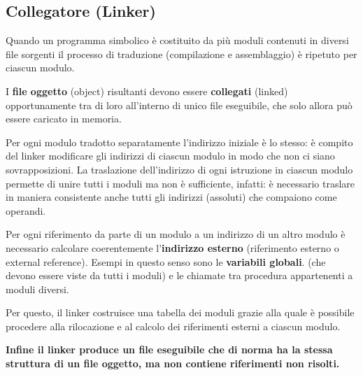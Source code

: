 \documentclass[12pt]{article} %
\begin{document}
\subsection{Collegatore (Linker)}
Quando un programma simbolico è costituito da più moduli contenuti in diversi file sorgenti il processo di traduzione (compilazione e assemblaggio) è ripetuto per ciascun modulo.\par\medskip\noindent 
I \textbf{file oggetto} (object) risultanti devono essere \textbf{collegati} (linked) opportunamente tra di loro all’interno di unico file eseguibile, che solo allora può essere caricato in memoria.\par\medskip\noindent
Per ogni modulo tradotto separatamente l’indirizzo iniziale è lo stesso: è compito del linker modificare gli indirizzi di ciascun modulo in modo che non ci siano sovrapposizioni.
La traslazione dell’indirizzo di ogni istruzione in ciascun modulo permette di unire tutti i moduli ma non è sufficiente, infatti: è necessario traslare in maniera consistente anche tutti gli indirizzi (assoluti) che compaiono come operandi.\par\medskip\noindent
Per ogni riferimento da parte di un modulo a un indirizzo di un altro modulo è necessario calcolare coerentemente l’\textbf{indirizzo esterno} (riferimento esterno o external reference). Esempi in questo senso sono le \textbf{variabili globali}. (che devono essere viste da tutti i moduli) e le chiamate tra procedura appartenenti a moduli diversi.\par\medskip\noindent
Per questo, il linker costruisce una tabella dei moduli grazie alla quale è possibile procedere alla rilocazione e al calcolo dei riferimenti esterni a ciascun modulo.\par\medskip\noindent 
\textbf{ Infine il linker produce un file eseguibile che di norma ha la stessa struttura di un file oggetto, ma non contiene riferimenti non risolti.}\par\medskip\noindent 
\end{document}
